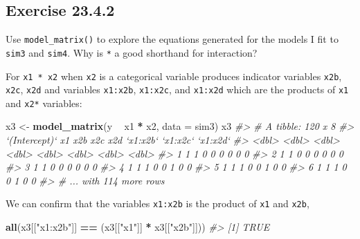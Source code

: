 \documentclass[]{book}
\newenvironment{Shaded}{\begin{snugshade}}{\end{snugshade}}
\newcommand{\CommentTok}[1]{\textcolor[rgb]{0.56,0.35,0.01}{\textit{#1}}}
\newcommand{\DataTypeTok}[1]{\textcolor[rgb]{0.13,0.29,0.53}{#1}}
\newcommand{\KeywordTok}[1]{\textcolor[rgb]{0.13,0.29,0.53}{\textbf{#1}}}
\newcommand{\NormalTok}[1]{#1}
\newcommand{\OperatorTok}[1]{\textcolor[rgb]{0.81,0.36,0.00}{\textbf{#1}}}
\newcommand{\StringTok}[1]{\textcolor[rgb]{0.31,0.60,0.02}{#1}}
\theoremstyle{plain}
\theoremstyle{remark}
\theoremstyle{definition}
\theoremstyle{definition}
\theoremstyle{definition}
\theoremstyle{remark}
\begin{document}
\hypertarget{exercise-23.4.2}{%
\subsection*{\texorpdfstring{Exercise
{23.4.2}}{Exercise 23.4.2}}\label{exercise-23.4.2}}

Use \texttt{model\_matrix()} to explore the equations generated for the
models I fit to \texttt{sim3} and \texttt{sim4}. Why is \texttt{*} a
good shorthand for interaction?

For \texttt{x1\ *\ x2} when \texttt{x2} is a categorical variable
produces indicator variables \texttt{x2b}, \texttt{x2c}, \texttt{x2d}
and variables \texttt{x1:x2b}, \texttt{x1:x2c}, and \texttt{x1:x2d}
which are the products of \texttt{x1} and \texttt{x2*} variables:

\begin{Shaded}
\begin{Highlighting}[]
\NormalTok{x3 <-}\StringTok{ }\KeywordTok{model_matrix}\NormalTok{(y }\OperatorTok{~}\StringTok{ }\NormalTok{x1 }\OperatorTok{*}\StringTok{ }\NormalTok{x2, }\DataTypeTok{data =}\NormalTok{ sim3)}
\NormalTok{x3}
\CommentTok{#> # A tibble: 120 x 8}
\CommentTok{#>   `(Intercept)`    x1   x2b   x2c   x2d `x1:x2b` `x1:x2c` `x1:x2d`}
\CommentTok{#>           <dbl> <dbl> <dbl> <dbl> <dbl>    <dbl>    <dbl>    <dbl>}
\CommentTok{#> 1             1     1     0     0     0        0        0        0}
\CommentTok{#> 2             1     1     0     0     0        0        0        0}
\CommentTok{#> 3             1     1     0     0     0        0        0        0}
\CommentTok{#> 4             1     1     1     0     0        1        0        0}
\CommentTok{#> 5             1     1     1     0     0        1        0        0}
\CommentTok{#> 6             1     1     1     0     0        1        0        0}
\CommentTok{#> # ... with 114 more rows}
\end{Highlighting}
\end{Shaded}

We can confirm that the variables \texttt{x1:x2b} is the product of
\texttt{x1} and \texttt{x2b},

\begin{Shaded}
\begin{Highlighting}[]
\KeywordTok{all}\NormalTok{(x3[[}\StringTok{"x1:x2b"}\NormalTok{]] }\OperatorTok{==}\StringTok{ }\NormalTok{(x3[[}\StringTok{"x1"}\NormalTok{]] }\OperatorTok{*}\StringTok{ }\NormalTok{x3[[}\StringTok{"x2b"}\NormalTok{]]))}
\CommentTok{#> [1] TRUE}
\end{Highlighting}
\end{Shaded}
\end{document}
